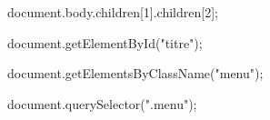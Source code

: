 document.body.children[1].children[2];

document.getElementById("titre");

document.getElementsByClassName("menu");

document.querySelector(".menu");
